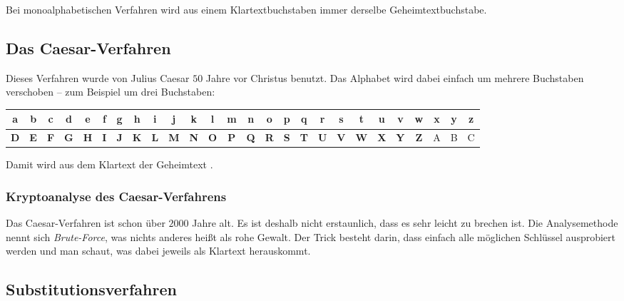 Bei monoalphabetischen Verfahren wird aus einem Klartextbuchstaben immer
derselbe Geheimtextbuchstabe.

\subsection{Das Caesar-Verfahren}

Dieses Verfahren wurde von Julius Caesar $50$ Jahre vor Christus benutzt. Das
Alphabet wird dabei einfach um mehrere Buchstaben verschoben -- zum Beispiel um
drei Buchstaben:

\bgroup
\def\arraystretch{1.2}
\setlength{\tabcolsep}{.5em}
\begin{tabular}{|c|c|c|c|c|c|c|c|c|c|c|c|c|c|c|c|c|c|c|c|c|c|c|c|c|c|}\hline
a & b & c & \textbf{d} & \textbf{e} & \textbf{f} & \textbf{g} & \textbf{h} &
\textbf{i} & \textbf{j} & \textbf{k} & \textbf{l} & \textbf{m} & \textbf{n} &
\textbf{o} & \textbf{p} & \textbf{q} & \textbf{r} & \textbf{s} & \textbf{t} &
\textbf{u} & \textbf{v} & \textbf{w} & \textbf{x} & \textbf{y} & \textbf{z}
\\ \hline
\textbf{D} & \textbf{E} & \textbf{F} & \textbf{G} & \textbf{H} & \textbf{I} &
\textbf{J} & \textbf{K} & \textbf{L} & \textbf{M} & \textbf{N} & \textbf{O} &
\textbf{P} & \textbf{Q} & \textbf{R} & \textbf{S} & \textbf{T} & \textbf{U} &
\textbf{V} & \textbf{W} & \textbf{X} & \textbf{Y} & \textbf{Z} & A & B & C
\\ \hline
\end{tabular}
\egroup

Damit wird aus dem Klartext  der Geheimtext
.

\subsubsection{Kryptoanalyse des Caesar-Verfahrens}

Das Caesar-Verfahren ist schon über $2000$ Jahre alt. Es ist deshalb nicht
erstaunlich, dass es sehr leicht zu brechen ist. Die Analysemethode nennt sich
\emph{Brute-Force}, was nichts anderes heißt als \glqq rohe Gewalt\grqq . Der
Trick besteht darin, dass einfach alle möglichen Schlüssel ausprobiert werden
und man schaut, was dabei jeweils als Klartext herauskommt.


\subsection{Substitutionsverfahren}

